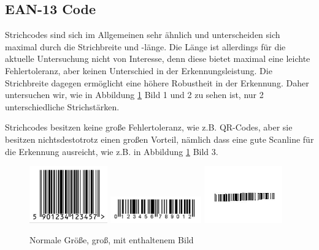 \subsection*{EAN-13 Code}
\writtenby{\dcauthornameriren}%
Strichcodes sind sich im Allgemeinen sehr ähnlich und unterscheiden sich maximal durch die Strichbreite und -länge. Die Länge ist allerdings für die aktuelle Untersuchung nicht von Interesse, denn diese bietet maximal eine leichte Fehlertoleranz, aber keinen Unterschied in der Erkennungsleistung. Die Strichbreite dagegen ermöglicht eine höhere Robustheit in der Erkennung. Daher untersuchen wir, wie in Abbildung \ref*{fig:eannormal} Bild 1 und 2 zu sehen ist, nur 2 unterschiedliche Strichstärken. 

Strichcodes besitzen keine große Fehlertoleranz, wie z.B. QR-Codes, aber sie besitzen nichtsdestotrotz einen großen Vorteil, nämlich dass eine gute Scanline für die Erkennung ausreicht, wie z.B. in Abbildung \ref*{fig:eannormal} Bild 3.
\begin{figure}[H]
  \centering
  \includegraphics[width=0.30\textwidth]{img/EAN13/perfect_01.jpg}
  \includegraphics[width=0.35\textwidth]{img/EAN13/perfect_02.jpg}
  \includegraphics[width=0.30\textwidth]{img/EAN13/compensation_01.jpg}
  \caption{Normale Größe, groß, mit enthaltenem Bild}
  \label{fig:eannormal}
\end{figure}

